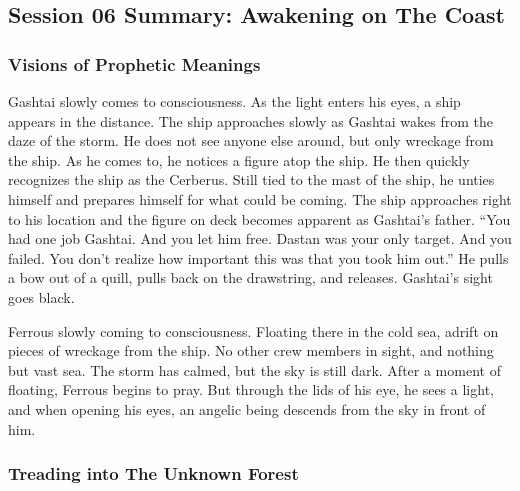 \subsection{Session 06 Summary: Awakening on The Coast}

\subsubsection{Visions of Prophetic Meanings}

Gashtai slowly comes to consciousness. As the light enters his eyes, a ship appears in the distance. The ship approaches slowly as Gashtai wakes from the daze of the storm. He does not see anyone else around, but only wreckage from the ship. As he comes to, he notices a figure atop the ship. He then quickly recognizes the ship as the Cerberus. Still tied to the mast of the ship, he unties himself and prepares himself for what could be coming. The ship approaches right to his location and the figure on deck becomes apparent as Gashtai's father. ``You had one job Gashtai. And you let him free. Dastan was your only target. And you failed. You don't realize how important this was that you took him out.'' He pulls a bow out of a quill, pulls back on the drawstring, and releases. Gashtai's sight goes black.

Ferrous slowly coming to consciousness. Floating there in the cold sea, adrift on pieces of wreckage from the ship. No other crew members in sight, and nothing but vast sea. The storm has calmed, but the sky is still dark.	After a moment of floating, Ferrous begins to pray. But through the lids of his eye, he sees a light, and when opening his eyes, an angelic being descends from the sky in front of him. 

	
\subsubsection{Treading into The Unknown Forest}

